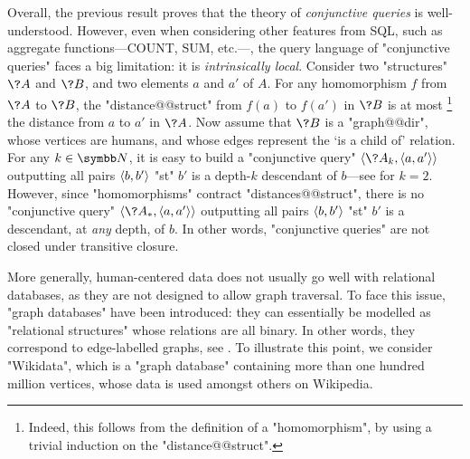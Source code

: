 \begin{marginfigure}
	\centering
	\caption{
		\AP\label{fig:CQ-grandchild}
		A "conjunctive query" outputting all pairs of people with their grandchildren.
	}
\end{marginfigure}
Overall, the previous result proves that the theory of \emph{conjunctive queries} is well-understood.
However, even when considering other features from SQL, such as aggregate functions---\textsf{COUNT}, \textsf{SUM}, etc.---, the query language of "conjunctive queries" faces a big limitation:
it is \emph{intrinsically local}.
Consider two "structures" $\?A$ and $\?B$, and two elements $a$ and $a'$ of $A$.
For any homomorphism $f$ from $\?A$ to $\?B$, the "distance@@struct" from $f(a)$ to $f(a')$
in $\?B$ is at most%
\footnote{Indeed, this follows from the definition of a "homomorphism", by using a trivial induction on the "distance@@struct".}
the distance from $a$ to $a'$ in $\?A$.
Now assume that $\?B$ is a "graph@@dir", whose vertices are humans,
and whose edges represent the `is a child of' relation.
For any $k\in\N$, it is easy to build a "conjunctive query" $\tup{\?A_k, \tup{a, a'}}$
outputting all pairs $\langle b,b'\rangle$ "st" $b'$ is a depth-$k$ descendant of $b$---see
 for $k=2$.
However, since "homomorphisms" contract "distances@@struct", there is no
"conjunctive query" $\tup{\?A_*, \tup{a, a'}}$ outputting all pairs $\langle b,b'\rangle$
"st" $b'$ is a descendant, at \emph{any} depth, of $b$.
In other words, "conjunctive queries" are not closed under transitive closure.

More generally, human-centered data does not usually go well with
relational databases, as they are not designed to allow graph traversal.
To face this issue, "graph databases" have
been introduced: they can essentially be modelled
as "relational structures" whose relations are all binary. In other
words, they correspond to edge-labelled graphs, see .%
To illustrate this point, we consider
"Wikidata", which is a "graph database" containing more than one hundred million
vertices, whose data is used amongst others on Wikipedia. 

